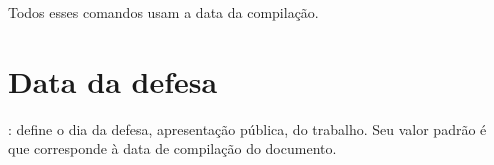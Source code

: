 Todos esses comandos usam a data da compilação.

\section{Data da defesa}

: define o dia da defesa, apresentação pública, do trabalho. Seu valor padrão é  que corresponde à data de compilação do documento.

\exemplo {}  